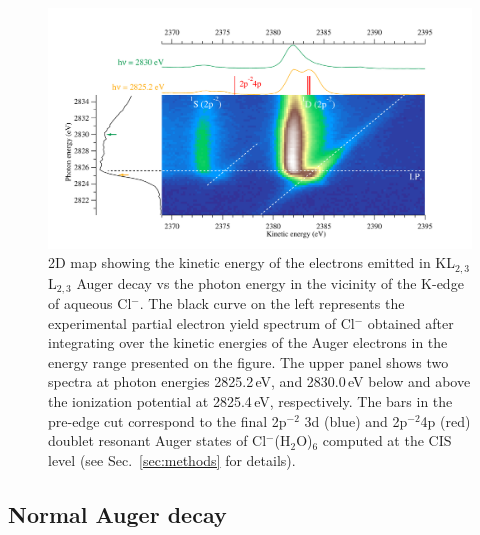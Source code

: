 \begin{figure}%
\centering
\includegraphics[scale=0.55]{figures/cl_2dmap.pdf}
\caption{2D map showing the kinetic energy of the electrons emitted in KL$_{2,3}$L$_{2,3}$ Auger decay vs the photon energy in the vicinity of the K-edge of aqueous Cl$^{-}$. The black curve on the left represents the experimental partial electron yield spectrum of Cl$^{-}$ obtained after integrating over the kinetic energies of the Auger electrons in the energy range presented on the figure. The upper panel shows two spectra at photon energies 2825.2\,eV, and 2830.0\,eV below and above the ionization potential at 2825.4\,eV, respectively. The bars in the pre-edge cut correspond to the final 2p$^{-2}$ 3d (blue) and 2p$^{-2}$4p (red) doublet resonant Auger states of Cl$^{-}$(H$_2$O)$_6$ computed at the CIS level (see Sec.\ \ref{sec:methods} for details).}
\label{fg:2dmap_cl}
\end{figure}


\subsection{Normal Auger decay}\label{ssec:na}

